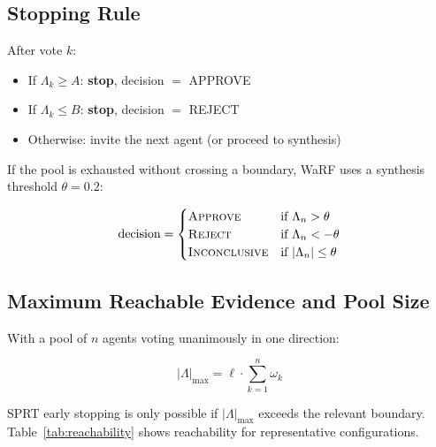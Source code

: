 \documentclass[11pt,a4paper]{article}
\begin{document}
\subsection{Stopping Rule}

After vote $k$:
\begin{itemize}
  \item If $\Lambda_k \geq A$: \textbf{stop}, decision $=$ APPROVE
  \item If $\Lambda_k \leq B$: \textbf{stop}, decision $=$ REJECT
  \item Otherwise: invite the next agent (or proceed to synthesis)
\end{itemize}

If the pool is exhausted without crossing a boundary, WaRF uses a synthesis
threshold $\theta = 0.2$:

\begin{equation}
  \text{decision} = \begin{cases}
    \textsc{Approve}      & \text{if } \Lambda_n > \theta \\
    \textsc{Reject}       & \text{if } \Lambda_n < -\theta \\
    \textsc{Inconclusive} & \text{if } |\Lambda_n| \leq \theta
  \end{cases}
\end{equation}

\subsection{Maximum Reachable Evidence and Pool Size}

With a pool of $n$ agents voting unanimously in one direction:

\begin{equation}
  |\Lambda|_{\max} = \ell \cdot \sum_{k=1}^{n} \omega_k
  \label{eq:max_lambda}
\end{equation}

SPRT early stopping is only possible if $|\Lambda|_{\max}$ exceeds the
relevant boundary. Table~\ref{tab:reachability} shows reachability for
representative configurations.
\end{document}
